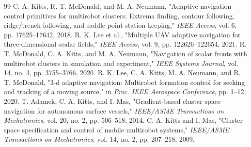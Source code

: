 \documentclass[10pt]{article}
\begin{document}
{\small
\renewcommand{\refname}{\normalsize References (paper numbering)}
\begin{thebibliography}{99}
\setlength{\itemsep}{0pt}
 C. A. Kitts, R. T. McDonald, and M. A. Neumann, "Adaptive navigation control primitives for multirobot clusters: Extrema finding, contour following, ridge/trench following, and saddle point station keeping," \textit{IEEE Access}, vol. 6, pp. 17625--17642, 2018.
 R. K. Lee et al., "Multiple UAV adaptive navigation for three-dimensional scalar fields," \textit{IEEE Access}, vol. 9, pp. 122626--122654, 2021.
 R. T. McDonald, C. A. Kitts, and M. A. Neumann, "Navigation of scalar fronts with multirobot clusters in simulation and experiment," \textit{IEEE Systems Journal}, vol. 14, no. 3, pp. 3755--3766, 2020.
 R. K. Lee, C. A. Kitts, M. A. Neumann, and R. T. McDonald, "3-d adaptive navigation: Multirobot formation control for seeking and tracking of a moving source," in \textit{Proc. IEEE Aerospace Conference}, pp. 1--12, 2020.
 T. Adamek, C. A. Kitts, and I. Mas, "Gradient-based cluster space navigation for autonomous surface vessels," \textit{IEEE/ASME Transactions on Mechatronics}, vol. 20, no. 2, pp. 506--518, 2014.
 C. A. Kitts and I. Mas, "Cluster space specification and control of mobile multirobot systems," \textit{IEEE/ASME Transactions on Mechatronics}, vol. 14, no. 2, pp. 207--218, 2009.
\end{thebibliography}
}
\end{document}
